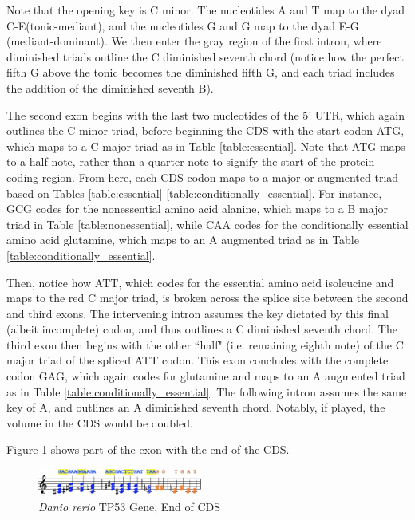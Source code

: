 \documentclass[letterpaper]{article}
\begin{document}
Note that the opening key is C minor. The nucleotides  A and T map to the dyad C-E\musFlat \;(tonic-mediant), and the nucleotides G and G map to the dyad E\musFlat-G (mediant-dominant). We then enter the gray region of the first intron, where diminished triads outline the C diminished seventh chord (notice how the perfect fifth G above the tonic becomes the diminished fifth G\musFlat, and each triad includes the addition of the diminished seventh B\musDoubleFlat).


The second exon begins with the last two nucleotides of the 5’ UTR, which again outlines the C minor triad, before beginning the CDS with the start codon ATG, which maps to a C major triad as in Table \ref{table:essential}. Note that ATG maps to a half note, rather than a quarter note to signify the start of the protein-coding region. From here, each CDS codon maps to a major or augmented triad based on Tables  \ref{table:essential}-\ref{table:conditionally_essential}. For instance, GCG codes for the nonessential amino acid alanine, which maps to a B\musFlat\; major triad in Table \ref{table:nonessential}, while CAA codes for the conditionally essential amino acid glutamine, which maps to an A augmented triad as in Table \ref{table:conditionally_essential}.

Then, notice how ATT, which codes for the essential amino acid isoleucine and maps to the red C\musSharp\; major triad, is broken across the splice site between the second and third exons. The intervening intron assumes the key dictated by this final (albeit incomplete) codon, and thus outlines a C\musSharp \; diminished seventh chord. The third exon then begins with the other ``half" (i.e.  remaining eighth note) of the C\musSharp\; major triad of the spliced ATT codon. This exon concludes with the complete codon GAG, which again codes for glutamine and maps to an A augmented triad as in Table \ref{table:conditionally_essential}. The following intron assumes the same key of A, and outlines an A \; diminished seventh chord. Notably, if played, the volume in the CDS would be doubled.

Figure \ref{fig:danio_rerio_end_translation} shows part of the exon with the end of the CDS. 

\begin{figure}[h!]
\centering
\vspace{-3mm}
\includegraphics[width=0.48\textwidth]{images/danio_rerio_end_translation}
  \caption{\textit{Danio rerio} TP53 Gene, End of CDS}
  \label{fig:danio_rerio_end_translation}
  \vspace{-4mm}
\end{figure}
\end{document}
